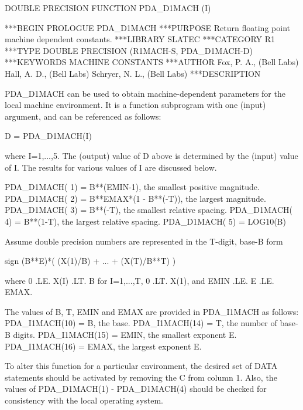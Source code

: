 \documentclass[11pt,twoside,nolof]{starlink}
\begin{document}
\begin{terminalv}
      DOUBLE PRECISION FUNCTION PDA_D1MACH (I)


***BEGIN PROLOGUE  PDA_D1MACH
***PURPOSE  Return floating point machine dependent constants.
***LIBRARY   SLATEC
***CATEGORY  R1
***TYPE      DOUBLE PRECISION (R1MACH-S, PDA_D1MACH-D)
***KEYWORDS  MACHINE CONSTANTS
***AUTHOR  Fox, P. A., (Bell Labs)
           Hall, A. D., (Bell Labs)
           Schryer, N. L., (Bell Labs)
***DESCRIPTION

   PDA_D1MACH can be used to obtain machine-dependent parameters for the
   local machine environment.  It is a function subprogram with one
   (input) argument, and can be referenced as follows:

        D = PDA_D1MACH(I)

   where I=1,...,5.  The (output) value of D above is determined by
   the (input) value of I.  The results for various values of I are
   discussed below.

   PDA_D1MACH( 1) = B**(EMIN-1), the smallest positive magnitude.
   PDA_D1MACH( 2) = B**EMAX*(1 - B**(-T)), the largest magnitude.
   PDA_D1MACH( 3) = B**(-T), the smallest relative spacing.
   PDA_D1MACH( 4) = B**(1-T), the largest relative spacing.
   PDA_D1MACH( 5) = LOG10(B)

   Assume double precision numbers are represented in the T-digit,
   base-B form

              sign (B**E)*( (X(1)/B) + ... + (X(T)/B**T) )

   where 0 .LE. X(I) .LT. B for I=1,...,T, 0 .LT. X(1), and
   EMIN .LE. E .LE. EMAX.

   The values of B, T, EMIN and EMAX are provided in PDA_I1MACH as
   follows:
   PDA_I1MACH(10) = B, the base.
   PDA_I1MACH(14) = T, the number of base-B digits.
   PDA_I1MACH(15) = EMIN, the smallest exponent E.
   PDA_I1MACH(16) = EMAX, the largest exponent E.

   To alter this function for a particular environment, the desired
   set of DATA statements should be activated by removing the C from
   column 1.  Also, the values of PDA_D1MACH(1) - PDA_D1MACH(4) should be
   checked for consistency with the local operating system.


\end{terminalv}
\end{document}
